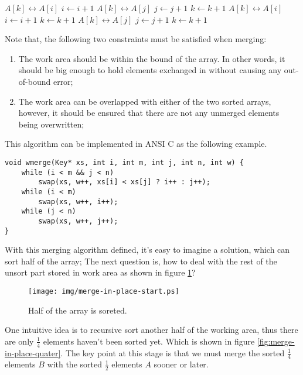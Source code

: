 \documentclass{article}
\begin{document}
\begin{algorithmic}
\Procedure{Merge}{$A, [i, m), [j, n), k$}
      \State {} $A[k] \leftrightarrow A[i]$
      \State $i \gets i + 1$
    \Else
      \State {} $A[k] \leftrightarrow A[j]$
      \State $j \gets j + 1$
    \EndIf
    \State $k \gets k + 1$
  \EndWhile
    \State {} $A[k] \leftrightarrow A[i]$
    \State $i \gets i + 1$
    \State $k \gets k + 1$
  \EndWhile
    \State {} $A[k] \leftrightarrow A[j]$
    \State $j \gets j + 1$
    \State $k \gets k + 1$
  \EndWhile
\EndProcedure
\end{algorithmic}

Note that, the following two constraints must be satisfied when merging:

\begin{enumerate}
\item The work area should be within the bound of the array. In other words, it should be big 
enough to hold elements exchanged in without causing any out-of-bound error;
\item The work area can be overlapped with either of the two sorted arrays, however, it should
be ensured that there are not any unmerged elements being overwritten;
\end{enumerate}

This algorithm can be implemented in ANSI C as the following example.

\lstset{language=C}
\begin{lstlisting}
void wmerge(Key* xs, int i, int m, int j, int n, int w) {
    while (i < m && j < n)
        swap(xs, w++, xs[i] < xs[j] ? i++ : j++);
    while (i < m)
        swap(xs, w++, i++);
    while (j < n)
        swap(xs, w++, j++);
}  
\end{lstlisting}

With this merging algorithm defined, it's easy to imagine a solution, which can sort
half of the array; The next question is, how to deal with the rest of the unsort part
stored in work area as shown in figure \ref{fig:merge-in-place-start}?

\begin{figure}[htbp]
 \centering
 \texttt{[image: img/merge-in-place-start.ps]}
 \caption{Half of the array is soreted.}
 \label{fig:merge-in-place-start}
\end{figure}

One intuitive idea is to recursive sort another half of the working area, thus there are
only $\frac{1}{4}$ elements haven't been sorted yet. Which is shown in figure \ref{fig:merge-in-place-quater}.
The key point at this stage is that we must merge the sorted $\frac{1}{4}$ elements $B$
with the sorted $\frac{1}{2}$ elements $A$ sooner or later.
\end{document}
